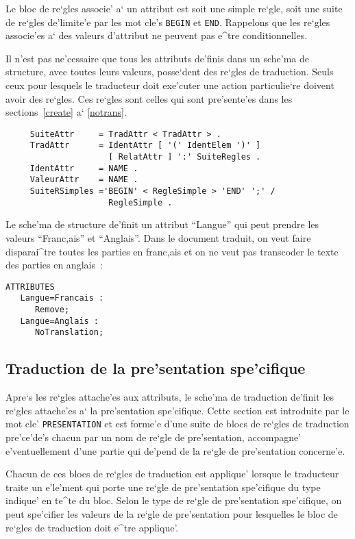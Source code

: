 {Le bloc de re`gles associe' a` un attribut est soit une simple re`gle, soit
une suite de re`gles de'limite'e par les mot cle's {\tt BEGIN} et {\tt END}.
Rappelons que les re`gles associe'es a` des valeurs d'attribut ne peuvent pas
e^tre conditionnelles.

Il n'est pas ne'cessaire que tous les attributs de'finis dans un sche'ma de
structure, avec toutes leurs valeurs, posse`dent des re`gles de traduction.
Seuls ceux pour lesquels le traducteur doit exe'cuter une action particulie`re
doivent avoir des re`gles. Ces re`gles sont celles qui sont pre'sente'es dans
les sections~\ref{create} a` \ref{notrans}.

\begin{verbatim}
     SuiteAttr     = TradAttr < TradAttr > .
     TradAttr      = IdentAttr [ '(' IdentElem ')' ] 
                     [ RelatAttr ] ':' SuiteRegles .
     IdentAttr     = NAME .
     ValeurAttr    = NAME .
     SuiteRSimples ='BEGIN' < RegleSimple > 'END' ';' / 
                     RegleSimple .
\end{verbatim}

\begin{example}
Le sche'ma de structure de'finit un attribut ``Langue'' qui peut prendre les
valeurs ``Franc,ais'' et ``Anglais''. Dans le document traduit, on veut faire
disparai^tre toutes les parties en franc,ais et on ne veut pas transcoder
le texte des parties en anglais~:
\begin{verbatim}
ATTRIBUTES
   Langue=Francais :
      Remove;
   Langue=Anglais :
      NoTranslation;
\end{verbatim}
\end{example}

\subsection{Traduction de la pre'sentation spe'cifique}
\label{prestrans}

Apre`s les re`gles attache'es aux attributs, le sche'ma de traduction
de'finit les re`gles attache'es a` la pre'sentation spe'cifique. Cette
section est introduite par le mot cle' {\tt PRESENTATION} et est forme'e
d'une suite de blocs de re`gles de traduction pre'ce'de's chacun par un
nom de re`gle de pre'sentation, accompagne' e'ventuellement d'une partie
qui de'pend de la re`gle de pre'sentation concerne'e.

Chacun de ces blocs de re`gles de traduction est applique' lorsque le
traducteur traite un e'le'ment qui porte une re`gle de pre'sentation
spe'cifique du type indique' en te^te du bloc. Selon le type de re`gle de
pre'sentation spe'cifique, on peut spe'cifier les valeurs de la re`gle de
pre'sentation pour lesquelles le bloc de re`gles de traduction doit e^tre
applique'.

}
